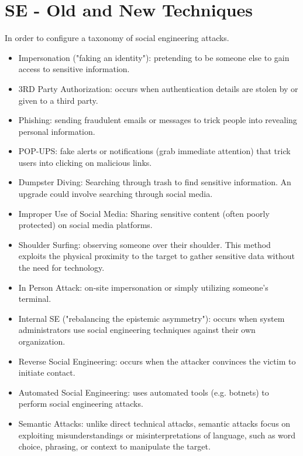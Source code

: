 \section{SE - Old and New Techniques}
\begin{center}
    In order to configure a taxonomy of social engineering attacks.
\end{center}
\begin{itemize}
    \item Impersonation ("faking an identity"): pretending to be someone else to gain access to sensitive information.
    \item 3RD Party Authorization: occurs when authentication details are stolen by or given to a third party.
    \item Phishing: sending fraudulent emails or messages to trick people into revealing personal information.
    \item POP-UPS: fake alerts or notifications (grab immediate attention) that trick users into clicking on malicious links.
    \item Dumpster Diving: Searching through trash to find sensitive information. An upgrade could involve searching through social media.
    \item Improper Use of Social Media: Sharing sensitive content (often poorly protected) on social media platforms.
    \item Shoulder Surfing: observing someone over their shoulder. This method exploits the physical proximity to the target to gather sensitive data without the need for technology.
    \item In Person Attack: on-site impersonation or simply utilizing someone's terminal.
    \item Internal SE ("rebalancing the epistemic asymmetry"): occurs when system administrators use social engineering techniques against their own organization.
    \item Reverse Social Engineering: occurs when the attacker convinces the victim to initiate contact.
    \item Automated Social Engineering: uses automated tools (e.g. botnets) to perform social engineering attacks.
    \item Semantic Attacks: unlike direct technical attacks, semantic attacks focus on exploiting misunderstandings or misinterpretations of language, such as word choice, phrasing, or context to manipulate the target.
\end{itemize}

